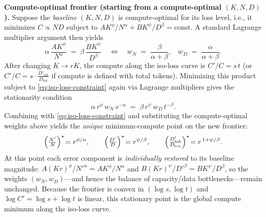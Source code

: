 \textbf{Compute-optimal frontier (starting from a compute-optimal $(K,N,D)$).}
Suppose the \emph{baseline} $(K,N,D)$ is compute-optimal for its loss level, i.e., it minimizes $C \propto N D$ subject to $A K^{\phi}/N^{\alpha} + B K^{\psi}/D^{\beta} = \text{const}$. A standard Lagrange multiplier argument then yields
\[
\alpha\,\frac{A K^{\phi}}{N^{\alpha}} \;=\; \beta\,\frac{B K^{\psi}}{D^{\beta}}
\quad\Longleftrightarrow\quad
w_N \;=\; \frac{\beta}{\alpha+\beta},
\;\;\;
w_D \;=\; \frac{\alpha}{\alpha+\beta}.
\]
After changing $K \to rK$, the compute along the iso-loss curve is $C'/C = s\,t$ (or $C'/C = s \cdot \tfrac{D'_{\mathrm{tot}}}{D_{\mathrm{tot}}}$ if compute is defined with total tokens).
Minimizing this product subject to \eqref{eq:iso-loss-constraint} again via Lagrange multipliers gives the stationarity condition
\[
\alpha\, r^{\phi}\, w_N\, s^{-\alpha} \;=\; \beta\, r^{\psi}\, w_D\, t^{-\beta}.
\]
Combining with \eqref{eq:iso-loss-constraint} and substituting the compute-optimal weights above yields the \emph{unique} minimum-compute point on the new frontier:
\[
\Bigl(\tfrac{N'}{N}\Bigr)^\star \!= r^{\phi/\alpha},
\qquad
\Bigl(\tfrac{D'}{D}\Bigr)^\star \!= r^{\psi/\beta},
\qquad
\Bigl(\tfrac{D'_{\mathrm{tot}}}{D_{\mathrm{tot}}}\Bigr)^\star \!= r^{\,1+\psi/\beta}.
\]
At this point each error component is \emph{individually restored} to its baseline magnitude:
\(
A (Kr)^{\phi}/N'^{\alpha} = A K^{\phi}/N^{\alpha}
\) and
\(
B (Kr)^{\psi}/D'^{\beta} = B K^{\psi}/D^{\beta}
\),
so the weights $(w_N,w_D)$—and hence the balance of capacity/data bottlenecks—remain unchanged. Because the frontier is convex in $(\log s,\log t)$ and $\log C'=\log s+\log t$ is linear, this stationary point is the global compute minimum along the iso-loss curve.

